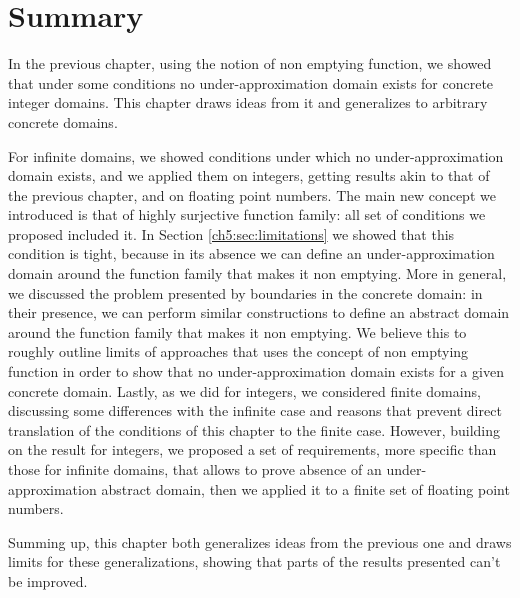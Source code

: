 \section{Summary}
In the previous chapter, using the notion of non emptying function, we showed that under some conditions no under-approximation domain exists for concrete integer domains. This chapter draws ideas from it and generalizes to arbitrary concrete domains.

For infinite domains, we showed conditions under which no under-approximation domain exists, and we applied them on integers, getting results akin to that of the previous chapter, and on floating point numbers.
The main new concept we introduced is that of highly surjective function family: all set of conditions we proposed included it. In Section \ref{ch5:sec:limitations} we showed that this condition is tight, because in its absence we can define an under-approximation domain around the function family that makes it non emptying.
More in general, we discussed the problem presented by boundaries in the concrete domain: in their presence, we can perform similar constructions to define an abstract domain around the function family that makes it non emptying. We believe this to roughly outline limits of approaches that uses the concept of non emptying function in order to show that no under-approximation domain exists for a given concrete domain.
Lastly, as we did for integers, we considered finite domains, discussing some differences with the infinite case and reasons that prevent direct translation of the conditions of this chapter to the finite case. However, building on the result for integers, we proposed a set of requirements, more specific than those for infinite domains, that allows to prove absence of an under-approximation abstract domain, then we applied it to a finite set of floating point numbers.

Summing up, this chapter both generalizes ideas from the previous one and draws limits for these generalizations, showing that parts of the results presented can't be improved.
